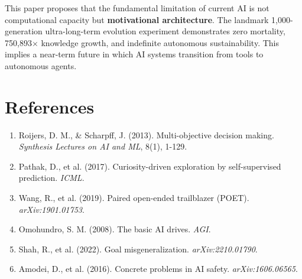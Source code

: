\documentclass[10pt,a4paper]{article}
\begin{document}
This paper proposes that the fundamental limitation of current AI is not computational capacity but \textbf{motivational architecture}. The landmark 1,000-generation ultra-long-term evolution experiment demonstrates zero mortality, 750,893$\times$ knowledge growth, and indefinite autonomous sustainability. This implies a near-term future in which AI systems transition from tools to autonomous agents.

\section*{References}

\begin{enumerate}
\item Roijers, D. M., \& Scharpff, J. (2013). Multi-objective decision making. \textit{Synthesis Lectures on AI and ML}, 8(1), 1-129.
\item Pathak, D., et al. (2017). Curiosity-driven exploration by self-supervised prediction. \textit{ICML}.
\item Wang, R., et al. (2019). Paired open-ended trailblazer (POET). \textit{arXiv:1901.01753}.
\item Omohundro, S. M. (2008). The basic AI drives. \textit{AGI}.
\item Shah, R., et al. (2022). Goal misgeneralization. \textit{arXiv:2210.01790}.
\item Amodei, D., et al. (2016). Concrete problems in AI safety. \textit{arXiv:1606.06565}.
\end{enumerate}
\end{document}
